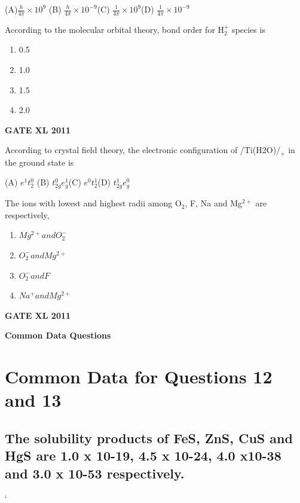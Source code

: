 \documentclass[journal,12pt,onecolumn]{IEEEtran}
\begin{document}
\begin{enumerate}
{		(A)$\frac{h}{4\pi} \times 10^{9}$ \hspace{10mm} (B) $\frac{h}{4\pi} \times 10^{-9}$\hspace{10mm}(C) $\frac{1}{4\pi} \times 10^{9}$\hspace{10mm}(D) $\frac{1}{4\pi} \times 10^{-9}$
	\item {According to the molecular orbital theory, bond order for H$_2^+$ species is}
	\begin{enumerate}
\item{ 0.5}
\item{ 1.0}

\item{ 1.5}

\item{ 2.0}
	\end{enumerate}\hfill{\textbf{GATE XL 2011}}


\item {According to crystal field theory, the electronic configuration of /Ti(H2O)/$_+$ in the ground state is}


(A) $e^1t^0_2$ \hspace{10mm} (B) $t^0_{2g}e_g^1$\hspace{10mm}(C) $e^0t^1_2$\hspace{10mm}(D) $t^1_{2g}e^0_g $

\item {The ions with lowest and highest radii among O$_2$, F, Na and Mg$^{2+}$ are respectively,}


		\begin{enumerate}
			\item{ $Mg^{2+} and O_2^-$}
			\item{ $O_2^- and Mg^{2+}$}
			\item{ $O_2^- and F$}
			\item{ $Na^+ and Mg^{2+}$}

		\end{enumerate}\hfill{\textbf{GATE XL 2011}}


\textbf{Common Data Questions}
\newline
\section{Common Data for Questions 12 and 13}

\subsection{The solubility products of FeS, ZnS, CuS and HgS are 1.0 x 10-19, 4.5 x 10-24, 4.0 x10-38 and 3.0 x 10-53 respectively.}`

}
\end{enumerate}
\end{document}
